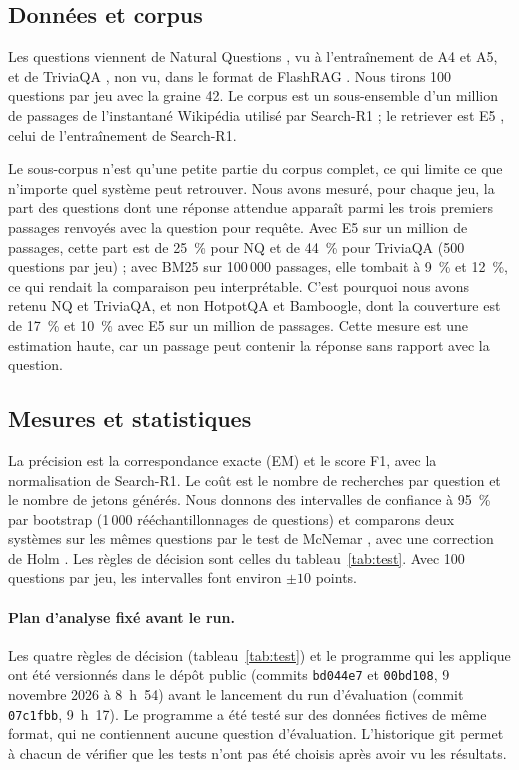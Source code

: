 \subsection{Données et corpus}
Les questions viennent de Natural Questions \citep{kwiatkowski2019natural}, vu à l'entraînement de A4 et A5, et de TriviaQA \citep{joshi2017triviaqa}, non vu, dans le format de FlashRAG \citep{jin2024flashrag}. Nous tirons 100 questions par jeu avec la graine 42. Le corpus est un sous-ensemble d'un million de passages de l'instantané Wikipédia utilisé par Search-R1 ; le retriever est E5 \citep{wang2022text}, celui de l'entraînement de Search-R1.

Le sous-corpus n'est qu'une petite partie du corpus complet, ce qui limite ce que n'importe quel système peut retrouver. Nous avons mesuré, pour chaque jeu, la part des questions dont une réponse attendue apparaît parmi les trois premiers passages renvoyés avec la question pour requête. Avec E5 sur un million de passages, cette part est de 25~\% pour NQ et de 44~\% pour TriviaQA (500 questions par jeu) ; avec BM25 \citep{robertson2009probabilistic} sur 100\,000 passages, elle tombait à 9~\% et 12~\%, ce qui rendait la comparaison peu interprétable. C'est pourquoi nous avons retenu NQ et TriviaQA, et non HotpotQA et Bamboogle, dont la couverture est de 17~\% et 10~\% avec E5 sur un million de passages. Cette mesure est une estimation haute, car un passage peut contenir la réponse sans rapport avec la question.

\subsection{Mesures et statistiques}
La précision est la correspondance exacte (EM) et le score F1, avec la normalisation de Search-R1. Le coût est le nombre de recherches par question et le nombre de jetons générés. Nous donnons des intervalles de confiance à 95~\% par bootstrap \citep{efron1979bootstrap} (1\,000 rééchantillonnages de questions) et comparons deux systèmes sur les mêmes questions par le test de McNemar \citep{mcnemar1947note}, avec une correction de Holm \citep{holm1979simple}. Les règles de décision sont celles du tableau~\ref{tab:test}. Avec 100 questions par jeu, les intervalles font environ $\pm 10$ points.

\paragraph{Plan d'analyse fixé avant le run.} Les quatre règles de décision (tableau~\ref{tab:test}) et le programme qui les applique ont été versionnés dans le dépôt public (commits \texttt{bd044e7} et \texttt{00bd108}, 9 novembre 2026 à 8~h~54) avant le lancement du run d'évaluation (commit \texttt{07c1fbb}, 9~h~17). Le programme a été testé sur des données fictives de même format, qui ne contiennent aucune question d'évaluation. L'historique git permet à chacun de vérifier que les tests n'ont pas été choisis après avoir vu les résultats.

